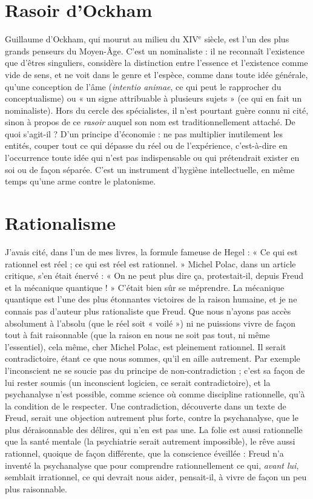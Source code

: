 \section{Rasoir d'Ockham}
Guillaume d’Ockham, qui mourut au milieu du
{\footnotesize XIV$^\text{e}$} siècle, est l’un des plus grands penseurs du
Moyen-Âge. C’est un nominaliste : il ne reconnaît l'existence que d’êtres singuliers,
considère la distinction entre l’essence et l'existence comme vide de sens,
et ne voit dans le genre et l’espèce, comme dans toute idée générale, qu’une
conception de l’âme ({\it intentio animae}, ce qui peut le rapprocher du conceptualisme)
ou « un signe attribuable à plusieurs sujets » (ce qui en fait un nominaliste).
Hors du cercle des spécialistes, il n’est pourtant guère connu ni cité,
sinon à propos de ce {\it rasoir} auquel son nom est traditionnellement attaché. De
quoi s'agit-il ? D’un principe d’économie : ne pas multiplier inutilement les
entités, couper tout ce qui dépasse du réel ou de l'expérience, c’est-à-dire en
l'occurrence toute idée qui n’est pas indispensable ou qui prétendrait exister en
soi ou de façon séparée. C’est un instrument d’hygiène intellectuelle, en même
temps qu’une arme contre le platonisme.

\section{Rationalisme}
J'avais cité, dans l’un de mes livres, la formule fameuse de
Hegel : « Ce qui est rationnel est réel ; ce qui est réel est
rationnel. » Michel Polac, dans un article critique, s’en était énervé : « On ne
peut plus dire ça, protestait-il, depuis Freud et la mécanique quantique ! »
C'était bien sûr se méprendre. La mécanique quantique est l’une des plus étonnantes
victoires de la raison humaine, et je ne connais pas d’auteur plus rationaliste
que Freud. Que nous n’ayons pas accès absolument à l'absolu (que le
réel soit « voilé ») ni ne puissions vivre de façon tout à fait raisonnable (que la
raison en nous ne soit pas tout, ni même l'essentiel), cela même, cher Michel
Polac, est pleinement rationnel. Il serait contradictoire, étant ce que nous
sommes, qu’il en aille autrement. Par exemple l'inconscient ne se soucie pas du
principe de non-contradiction ; c’est sa façon de lui rester soumis (un inconscient
logicien, ce serait contradictoire), et la psychanalyse n’est possible,
comme science où comme discipline rationnelle, qu’à la condition de le respecter.
Une contradiction, découverte dans un texte de Freud, serait une objection
autrement plus forte, contre la psychanalyse, que le plus déraisonnable des
délires, qui n’en est pas une. La folie est aussi rationnelle que la santé mentale
(la psychiatrie serait autrement impossible), le rêve aussi rationnel, quoique de
façon différente, que la conscience éveillée : Freud n’a inventé la psychanalyse
que pour comprendre rationnellement ce qui, {\it avant lui}, semblait irrationnel, ce
qui devrait nous aider, pensait-il, à vivre de façon un peu plus raisonnable.


